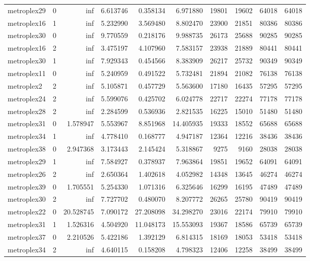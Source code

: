 \begin{longtable}{|l|r|r|r|r|r|r|r|r|r|}
metroplex29 & 0 & inf & 6.613746 & 0.358134 & 6.971880 & 19801 & 19602 & 64018 & 64018 \\
metroplex16 & 1 & inf & 5.232990 & 3.569480 & 8.802470 & 23900 & 21851 & 80386 & 80386 \\
metroplex30 & 0 & inf & 9.770559 & 0.218176 & 9.988735 & 26173 & 25688 & 90285 & 90285 \\
metroplex16 & 2 & inf & 3.475197 & 4.107960 & 7.583157 & 23938 & 21889 & 80441 & 80441 \\
metroplex30 & 1 & inf & 7.929343 & 0.454566 & 8.383909 & 26217 & 25732 & 90349 & 90349 \\
metroplex11 & 0 & inf & 5.240959 & 0.491522 & 5.732481 & 21894 & 21082 & 76138 & 76138 \\
metroplex2 & 2 & inf & 5.105871 & 0.457729 & 5.563600 & 17180 & 16435 & 57295 & 57295 \\
metroplex24 & 2 & inf & 5.599076 & 0.425702 & 6.024778 & 22717 & 22274 & 77178 & 77178 \\
metroplex28 & 2 & inf & 2.284599 & 0.536936 & 2.821535 & 16225 & 15010 & 51480 & 51480 \\
metroplex31 & 0 & 1.578947 & 5.553967 & 8.851968 & 14.405935 & 19333 & 18552 & 65688 & 65688 \\
metroplex34 & 1 & inf & 4.778410 & 0.168777 & 4.947187 & 12364 & 12216 & 38436 & 38436 \\
metroplex38 & 0 & 2.947368 & 3.173443 & 2.145424 & 5.318867 & 9275 & 9160 & 28038 & 28038 \\
metroplex29 & 1 & inf & 7.584927 & 0.378937 & 7.963864 & 19851 & 19652 & 64091 & 64091 \\
metroplex26 & 2 & inf & 2.650364 & 1.402618 & 4.052982 & 14348 & 13645 & 46274 & 46274 \\
metroplex39 & 0 & 1.705551 & 5.254330 & 1.071316 & 6.325646 & 16299 & 16195 & 47489 & 47489 \\
metroplex30 & 2 & inf & 7.727702 & 0.480070 & 8.207772 & 26265 & 25780 & 90419 & 90419 \\
metroplex22 & 0 & 20.528745 & 7.090172 & 27.208098 & 34.298270 & 23016 & 22174 & 79910 & 79910 \\
metroplex31 & 1 & 1.526316 & 4.504920 & 11.048173 & 15.553093 & 19367 & 18586 & 65739 & 65739 \\
metroplex37 & 0 & 2.210526 & 5.422186 & 1.392129 & 6.814315 & 18169 & 18053 & 53418 & 53418 \\
metroplex34 & 2 & inf & 4.640115 & 0.158208 & 4.798323 & 12406 & 12258 & 38499 & 38499 \\

\end{longtable}
